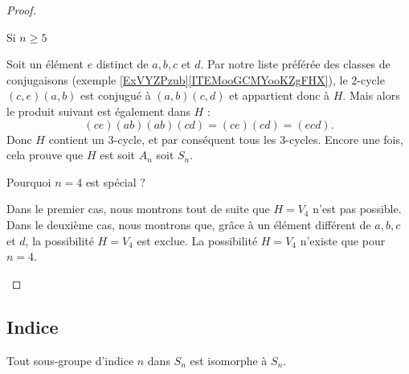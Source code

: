 \begin{proof}
\begin{subproof}
\begin{subproof}
                \item[Si \( n\geq 5\)]
                
                    Soit un élément \( e\) distinct de \( a,b,c\) et \( d\). Par notre liste préférée des classes de conjugaisons (exemple \ref{ExVYZPzub}\ref{ITEMooGCMYooKZgFHX}), le \( 2\)-cycle \( (c,e)(a,b)\) est conjugué à \( (a,b)(c,d)\) et appartient donc à \( H\). Mais alors le produit suivant est également dans \( H\) :
                    \begin{equation}
                        (ce)(ab)(ab)(cd)=(ce)(cd)=(ecd).
                    \end{equation}
                    Donc \( H\) contient un \( 3\)-cycle, et par conséquent tous les \( 3\)-cycles. Encore une fois, cela prouve que \( H\) est soit \( A_n\) soit \( S_n\).

        \item[Pourquoi \( n=4\) est spécial ?]

            Dans le premier cas, nous montrons tout de suite que \( H=V_4\) n'est pas possible. Dans le deuxième cas, nous montrons que, grâce à un élément différent de \( a,b,c\) et \( d\), la possibilité \( H=V_4\) est exclue. La possibilité \( H=V_4\) n'existe que pour \( n=4\).

    \end{subproof}
    \end{subproof}

\end{proof}

\subsection{Indice}

\begin{theorem}
    Tout sous-groupe d'indice \( n\) dans \( S_n\) est isomorphe à \( S_n\).
\end{theorem}

